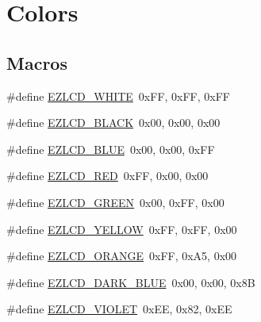 \hypertarget{group__ez_l_c_d__103__colors}{\section{Colors}
\label{group__ez_l_c_d__103__colors}
}
\subsection*{Macros}
\begin{DoxyCompactItemize}
\item 
\#define \hyperlink{group__ez_l_c_d__103__colors_ga952952e02b45f2935aa9f59414804b0d}{E\-Z\-L\-C\-D\-\_\-\-W\-H\-I\-T\-E}~0x\-F\-F, 0x\-F\-F, 0x\-F\-F
\item 
\#define \hyperlink{group__ez_l_c_d__103__colors_ga8f5a452b20fe0b028fe4b9ebee7b6a8f}{E\-Z\-L\-C\-D\-\_\-\-B\-L\-A\-C\-K}~0x00, 0x00, 0x00
\item 
\#define \hyperlink{group__ez_l_c_d__103__colors_ga4d6fad8736290190dc77416b6fd4c0ff}{E\-Z\-L\-C\-D\-\_\-\-B\-L\-U\-E}~0x00, 0x00, 0x\-F\-F
\item 
\#define \hyperlink{group__ez_l_c_d__103__colors_gac126383515b8eabf110583df7296eff6}{E\-Z\-L\-C\-D\-\_\-\-R\-E\-D}~0x\-F\-F, 0x00, 0x00
\item 
\#define \hyperlink{group__ez_l_c_d__103__colors_ga0c1e04eb08d8f3a66eac93e18958ca69}{E\-Z\-L\-C\-D\-\_\-\-G\-R\-E\-E\-N}~0x00, 0x\-F\-F, 0x00
\item 
\#define \hyperlink{group__ez_l_c_d__103__colors_ga0a7b71be8c2ea06139b9d8440be3876b}{E\-Z\-L\-C\-D\-\_\-\-Y\-E\-L\-L\-O\-W}~0x\-F\-F, 0x\-F\-F, 0x00
\item 
\#define \hyperlink{group__ez_l_c_d__103__colors_ga2e64a3a5c6ce4a0fddde82dd4ac41d0a}{E\-Z\-L\-C\-D\-\_\-\-O\-R\-A\-N\-G\-E}~0x\-F\-F, 0x\-A5, 0x00
\item 
\#define \hyperlink{group__ez_l_c_d__103__colors_gaa75c0d07cc9a0c45cd6836178e9e4c74}{E\-Z\-L\-C\-D\-\_\-\-D\-A\-R\-K\-\_\-\-B\-L\-U\-E}~0x00, 0x00, 0x8\-B
\item 
\#define \hyperlink{group__ez_l_c_d__103__colors_ga31df00075e04ecd92600a1416f615c0c}{E\-Z\-L\-C\-D\-\_\-\-V\-I\-O\-L\-E\-T}~0x\-E\-E, 0x82, 0x\-E\-E
\end{DoxyCompactItemize}
